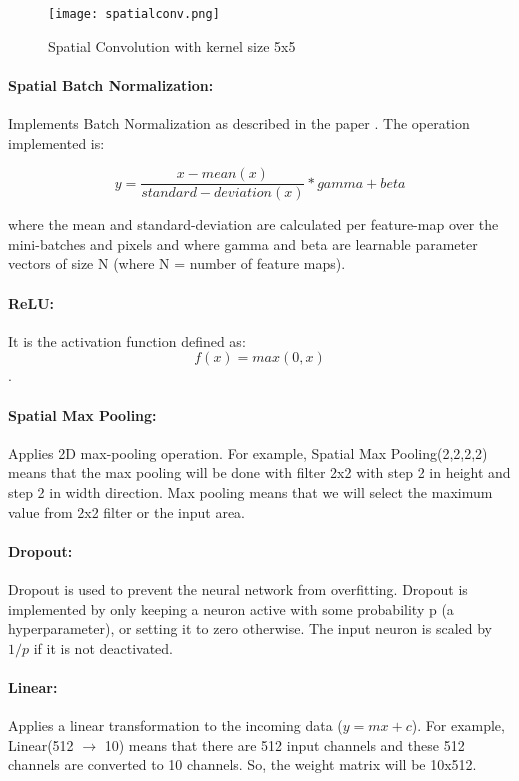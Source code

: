   \begin{figure}[h!]
  \centering
  \texttt{[image: spatialconv.png]}
  \caption{Spatial Convolution with kernel size 5x5} \label{spatialconv}
\end{figure}

\paragraph{Spatial Batch Normalization:}

Implements Batch Normalization as described in the paper \cite{26}. The operation implemented is:

 $$y=\frac{x - mean(x)}{standard-deviation(x)} * gamma + beta$$
 
 where the mean and standard-deviation are calculated per feature-map over the mini-batches and pixels and where gamma and beta are learnable parameter vectors of size N (where N = number of feature maps).
 
 
 \paragraph{ReLU:}
 It is the activation function defined as: $$f(x) = max(0,x)$$.
 
 
 \paragraph{Spatial Max Pooling:}
 Applies 2D max-pooling operation. For example, Spatial Max Pooling(2,2,2,2) means that the max pooling will be done with filter 2x2 with step 2 in height and step 2 in width direction. Max pooling means that we will select the maximum value from 2x2 filter or the input area.
 
 
 \paragraph{Dropout:}
 Dropout is used to prevent the neural network from overfitting. Dropout is implemented by only keeping a neuron active with some probability p (a hyperparameter), or setting it to zero otherwise. The input neuron is scaled by $1/p$ if it is not deactivated.
 
 \paragraph{Linear:}
 Applies a linear transformation to the incoming data ($y = mx + c$). For example, Linear(512 \(\rightarrow\) 10) means that there are 512 input channels and these 512 channels are converted to 10 channels. So, the weight matrix will be 10x512. 
 
